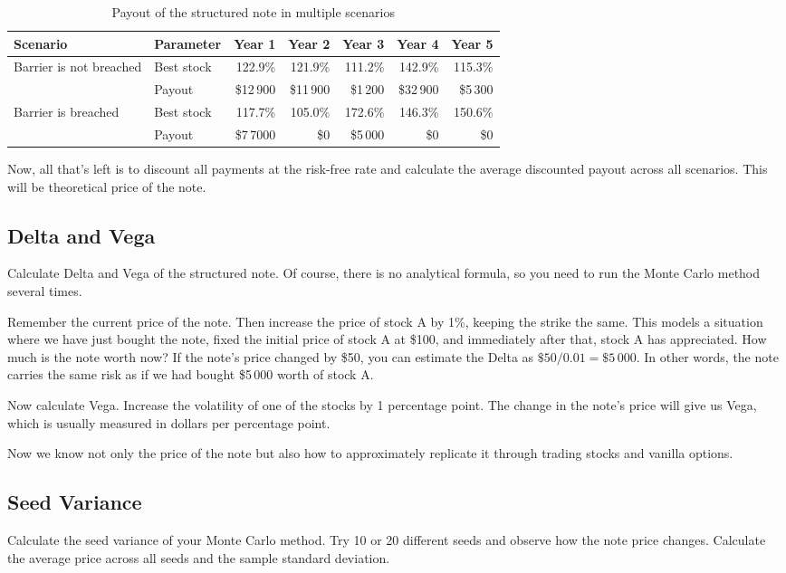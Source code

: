 \documentclass[a4paper,14pt]{extarticle}
\begin{document}
\begin{table}[h]
\centering
\small
\begin{tabular}{l|l|r|r|r|r|r}
Scenario & Parameter & Year 1 & Year 2 & Year 3 & Year 4 & Year 5 \\
\hline
Barrier is not breached & Best stock & 122.9\% & 121.9\% &	 111.2\%	& 142.9\% & 115.3\% \\
            & Payout      & \$12\,900 &       \$11\,900 & \$1\,200 &    \$32\,900 & \$5\,300 \\
\hline
Barrier is breached & Best stock & 117.7\% & 105.0\% & 172.6\%	& 146.3\% & 150.6\% \\
            & Payout      & \$7\,7000 &  \$0  &   \$5\,000 &    \$0 & \$0 \\ 

\end{tabular}
\caption{Payout of the structured note in multiple scenarios}
\label{table_note_payments}
\end{table}

Now, all that's left is to discount all payments at the risk-free rate and calculate the average discounted payout across all scenarios. This will be theoretical price of the note.

\subsection{Delta and Vega}

Calculate Delta and Vega of the structured note. Of course, there is no analytical formula, so you need to run the Monte Carlo method several times.

Remember the current price of the note. Then increase the price of stock A by 1\%, keeping the strike the same. This models a situation where we have just bought the note, fixed the initial price of stock A at \$100, and immediately after that, stock A has appreciated. How much is the note worth now? If the note's price changed by \$50, you can estimate the Delta as $\$50 / 0.01 = \$5\,000$. In other words, the note carries the same risk as if we had bought \$5\,000 worth of stock A.

Now calculate Vega. Increase the volatility of one of the stocks by 1 percentage point. The change in the note's price will give us Vega, which is usually measured in dollars per percentage point.

Now we know not only the price of the note but also how to approximately replicate it through trading stocks and vanilla options.

\subsection{Seed Variance}

Calculate the seed variance of your Monte Carlo method. Try 10 or 20 different seeds and observe how the note price changes. Calculate the average price across all seeds and the sample standard deviation.
\end{document}
